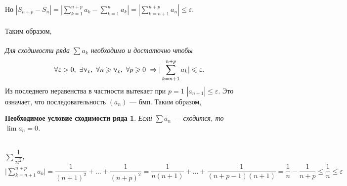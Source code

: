 Но $|S_{n+p}-S_{n}| = |\sum\limits_{k=1}^{n+p}a_k-\sum\limits_{k=1}^{n}a_k|=|\sum\limits_{k=n+1}^{n+p}a_n|\leqslant\varepsilon.$\\\\
Таким образом,\\\\
\textit{Для сходимости ряда $\sum a_k$ необходимо и достаточно} \textit{чтобы} $$\forall\varepsilon>0,\ \exists\nu_\varepsilon,\ \forall n \geqslant\nu_\varepsilon,\ \forall p\geqslant0\ \Ra |\sum\limits_{k=n+1}^{n+p}a_k|\leqslant\varepsilon.$$
Из последнего неравенства в частности вытекает при $p=1$ $|a_{n+1}|\leqslant\varepsilon$. Это означает, что последовательность $(a_n)$ --- бмп. Таким образом,
\newtheorem*{nys}{Необходимое условие сходимости ряда}
\begin{nys}
	Если $\sum a_n$ --- сходится, то $\lim a_n = 0$.
\end{nys}
\begin{example}
	\\$\sum\dfrac{1}{n^2}$,  $\Big|\sum\limits_{k=n+1}^{n+p}a_k\Big|=\dfrac{1}{(n+1)^2} + \ldots + \dfrac{1}{(n+p)^2} = \dfrac{1}{n(n+1)} + \ldots + \dfrac{1}{(n+p-1)(n+1)} = \dfrac{1}{n}-\dfrac{1}{n+p}\leqslant\dfrac{1}{n}\leqslant\varepsilon$
\end{example}
